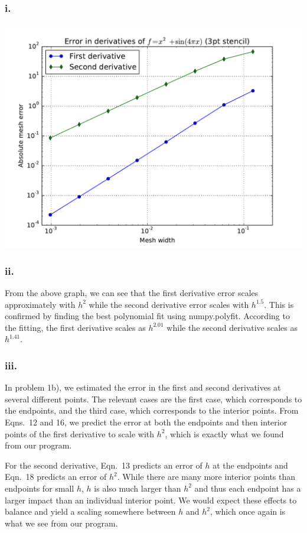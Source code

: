 \documentclass{article}
\begin{document}
\subsubsection*{i.}
\includegraphics[width=\linewidth]{3PtStencilError.pdf}
\subsubsection*{ii.}
From the above graph, we can see that the first derivative error scales approximately with $h^2$ while the second derivative error scales with $h^{1.5}$. This is confirmed by finding the best polynomial fit using numpy.polyfit. According to the fitting, the first derivative scales as $h^{2.01}$ while the second derivative scales as $h^{1.41}$.

\subsubsection*{iii.}
In problem 1b), we estimated the error in the first and second derivatives at several different points. The relevant cases are the first case, which corresponds to the endpoints, and the third case, which corresponds to the interior points. From Eqns.\ 12 and 16, we predict the error at both the endpoints and then interior points of the first derivative to scale with $h^2$, which is exactly what we found from our program. 

For the second derivative, Eqn.\ 13 predicts an error of $h$ at the endpoints and Eqn.\ 18 predicts an error of $h^2$. While there are many more interior points than endpoints for small $h$, $h$ is also much larger than $h^2$ and thus each endpoint has a larger impact than an individual interior point. We would expect these effects to balance and yield a scaling somewhere between $h$ and $h^2$, which once again is what we see from our program.
\end{document}
